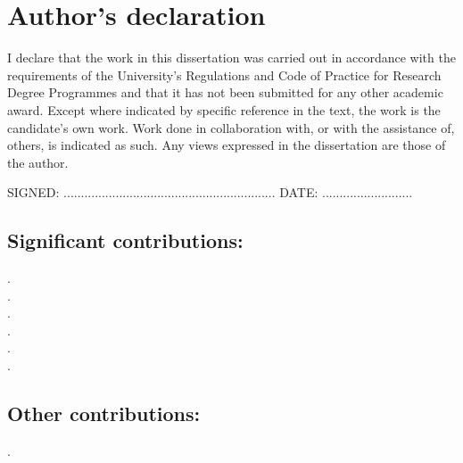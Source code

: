 \chapter*{Author's declaration}

I declare that the work in this dissertation was carried out in accordance with the requirements of the University's Regulations and Code of Practice for Research Degree Programmes and that it has not been submitted for any other academic award.
Except where indicated by specific reference in the text, the work is the candidate's own work.
Work done in collaboration with, or with the assistance of, others, is indicated as such. Any views expressed in the dissertation are those of the author.

\vspace{1cm}

SIGNED: .............................................................
\qquad
DATE: ..........................

\vspace{1cm}

\section*{Significant contributions:}

\cite{RobinsonPRL2019}\; . \\
\cite{GregsonJPCB2019}\; . \\
\cite{RobinsonJSTAT2019}\; . \\
\cite{RobinsonResummation2019}\; . \\
\cite{RobinsonTBD2019}\; . \\
\cite{GregsonTBD2019}\; . \\

\section*{Other contributions:}

\cite{RoyallJPCM2018}\; .
